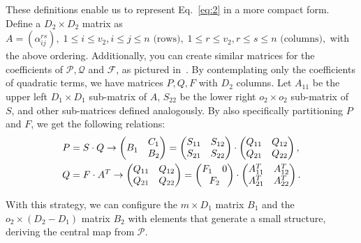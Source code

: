 \documentclass[12pt]{article}
\begin{document}
These definitions enable us to represent Eq.~\ref{eq:2} in a more compact form. Define a $D_{2} \times D_{2}$ matrix as
$
    A = (\alpha_{ij}^{rs}),\; 1 \leq i \leq v_{2}, i \leq j \leq n \text{ (rows)},\; 1 \leq r \leq v_{2}, r \leq s \leq n \text{ (columns)},
$
with the above ordering. Additionally, you can create similar matrices for the coefficients of $\mathcal{P}, \mathcal{Q}$ and $\mathcal{F}$, as pictured in~\cite[Figure 7.5]{Petzoldt:phd:2013:jul}. By contemplating only the coefficients of quadratic terms, we have matrices $P, Q, F$ with $D_{2}$ columns. Let $A_{11}$ be the upper left $D_{1} \times D_{1}$ sub-matrix of $A$, $S_{22}$ be the lower right $o_{2} \times o_{2}$ sub-matrix of $S$, and other sub-matrices defined analogously. By also specifically partitioning $P$ and $F$, we get the following relations:
\begin{align}\label{eq:3}
    P &= S \cdot Q \rightarrow
    \begin{pmatrix}
        B_{1} & \begin{matrix} C_{1} \\ B_{2} \end{matrix} \\
    \end{pmatrix} =
    \begin{pmatrix}
        S_{11} & S_{12} \\
        S_{21} & S_{22}
    \end{pmatrix} \cdot
    \begin{pmatrix}
        Q_{11} & Q_{12} \\
        Q_{21} & Q_{22}
    \end{pmatrix}, \\
    \label{eq:4}
    Q &= F \cdot A^{T} \rightarrow
    \begin{pmatrix}
        Q_{11} & Q_{12} \\
        Q_{21} & Q_{22}
    \end{pmatrix} =
    \begin{pmatrix}
        F_{1} & 0 \\
        \multicolumn{2}{c}{F_{2}}
    \end{pmatrix} \cdot
    \begin{pmatrix}
        A_{11}^{T} & A_{12}^{T} \\
        A_{21}^{T} & A_{22}^{T}
    \end{pmatrix}.
\end{align}

With this strategy, we can configure the $m \times D_{1}$ matrix $B_{1}$ and the $o_{2} \times (D_{2} - D_{1})$ matrix $B_{2}$ with elements that generate a small structure, deriving the central map from $\mathcal{P}$.
\end{document}
